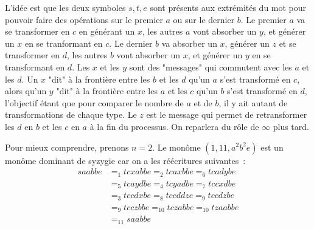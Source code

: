 \documentclass{article}
\begin{document}
L'idée est que les deux symboles $s, t, e$ sont présents aux extrémités du mot pour pouvoir faire des opérations sur le premier $a$ ou sur le dernier $b$.
Le premier $a$ va se transformer en $c$ en générant un $x$, les autres $a$ vont absorber un $y$, et générer un $x$ en se tranformant en $c$.
Le dernier $b$ va absorber un $x$, générer un $z$ et se transformer en $d$, les autres $b$ vont absorber un $x$, et générer un $y$ en se transformant en $d$.
Les $x$ et les $y$ sont des "messages" qui commutent avec les $a$ et les $d$. Un $x$ "dit" à la frontière entre les $b$ et les $d$ qu'un $a$ s'est transformé en $c$, alors qu'un $y$ "dit" à la frontière entre les $a$ et les $c$ qu'un $b$ s'est transformé en $d$, l'objectif étant que pour comparer le nombre de $a$ et de $b$, il y ait autant de transformations de chaque type.
Le $z$ est le message qui permet de retransformer les $d$ en $b$ et les $c$ en $a$ à la fin du processus. On reparlera du rôle de $\infty$ plus tard.

Pour mieux comprendre, prenons $n = 2$. Le monôme $(1, 11, a^2b^2e)$ est un monôme dominant de syzygie car on a les réécritures suivantes~:
\begin{align*}
saabbe & =_{1} tcxabbe =_{2} tcaxbbe =_{6} tcadybe \\
& =_{5} tcaydbe =_{4} tcyadbe =_{7} tccxdbe \\
& =_{3} tccdxbe =_{8} tccddze =_{9} tccdzbe \\
& =_{9} tcczbbe =_{10} tczabbe =_{10} tzaabbe \\
& =_{11} saabbe
\end{align*}
\end{document}
